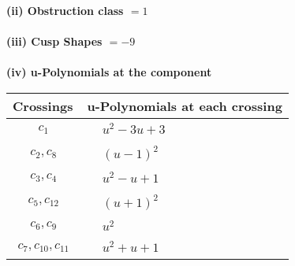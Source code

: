 \documentclass[1p]{elsarticle_modified}
\theoremstyle{definition}
\begin{document}
\flushleft \textbf{(ii) Obstruction class $= 1$}\\~\\
\flushleft \textbf{(iii) Cusp Shapes $= -9$}\\~\\
\newpage\renewcommand{\arraystretch}{1}
\flushleft \textbf{(iv) u-Polynomials at the component}\newline \\
\begin{tabular}{m{50pt}|m{274pt}}
Crossings & \hspace{64pt}u-Polynomials at each crossing \\
\hline $$\begin{aligned}c_{1}\end{aligned}$$&$\begin{aligned}
&u^2-3 u+3
\end{aligned}$\\
\hline $$\begin{aligned}c_{2},c_{8}\end{aligned}$$&$\begin{aligned}
&(u-1)^2
\end{aligned}$\\
\hline $$\begin{aligned}c_{3},c_{4}\end{aligned}$$&$\begin{aligned}
&u^2- u+1
\end{aligned}$\\
\hline $$\begin{aligned}c_{5},c_{12}\end{aligned}$$&$\begin{aligned}
&(u+1)^2
\end{aligned}$\\
\hline $$\begin{aligned}c_{6},c_{9}\end{aligned}$$&$\begin{aligned}
&u^2
\end{aligned}$\\
\hline $$\begin{aligned}c_{7},c_{10},c_{11}\end{aligned}$$&$\begin{aligned}
&u^2+u+1
\end{aligned}$\\
\hline
\end{tabular}\\~\\
\newpage\renewcommand{\arraystretch}{1}
\end{document}
